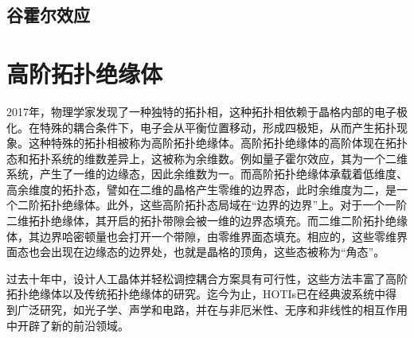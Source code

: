 \subsection{谷霍尔效应}
\section{高阶拓扑绝缘体}
2017年，物理学家发现了一种独特的拓扑相\cite{benalcazar2017quantized}，这种拓扑相依赖于晶格内部的电子极化。在特殊的耦合条件下，电子会从平衡位置移动，形成四极矩，从而产生拓扑现象。这种特殊的拓扑相被称为高阶拓扑绝缘体\cite{schindler2018higher,xie2021higher}。高阶拓扑绝缘体的高阶体现在拓扑态和拓扑系统的维数差异上，这被称为余维数。例如量子霍尔效应，其为一个二维系统，产生了一维的边缘态，因此余维数为一。而高阶拓扑绝缘体承载着低维度、高余维度的拓扑态，譬如在二维的晶格产生零维的边界态，此时余维度为二，是一个二阶拓扑绝缘体。此外，这些高阶拓扑态局域在“边界的边界”上。对于一个一阶二维拓扑绝缘体，其开启的拓扑带隙会被一维的边界态填充。而二维二阶拓扑绝缘体，其边界哈密顿量也会打开一个带隙，由零维界面态填充。相应的，这些零维界面态也会出现在边缘态的边界处，也就是晶格的顶角，这些态被称为“角态”。

过去十年中，设计人工晶体并轻松调控耦合方案具有可行性，这些方法丰富了高阶拓扑绝缘体以及传统拓扑绝缘体的研究。迄今为止，HOTIs已在经典波系统中得到广泛研究，如光子学\cite{peterson2018quantized,xie2018second,chen2019direct,xie2019visualization,mittal2019photonic,ota2019photonic,el2019corner,he2020quadrupole,zhang2020higher,li2020higher}、声学\cite{serra2018observation,zhang2019dimensional,xue2019realization,qi2020acoustic,xue2020observation,weiner2020demonstration,ni2020demonstration}和电路\cite{imhof2018topolectrical,bao2019topoelectrical,zhang2019dimensional,liu2020octupole,zhang2021experimental}，并在与非厄米性\cite{luo2019higher,gao2021non}、无序\cite{zhang2021experimental,chen2020higher,li2020topological}和非线性\cite{zangeneh2019nonlinear,kirsch2021nonlinear}的相互作用中开辟了新的前沿领域。
